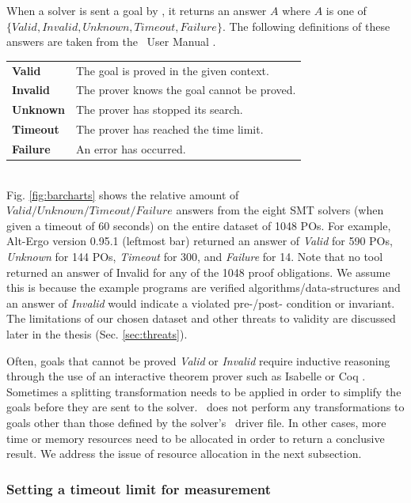 When a solver is sent a goal by \why, it returns an answer $A$ where $A$ is one of $\lbrace Valid,Invalid,Unknown,Timeout,Failure \rbrace$. The following definitions of these answers are taken from the \why~User Manual \cite{why:manual}.\\  

\begin{tabularx}
	{\textwidth}{@{}ll@{}}
	\textbf{Valid}   & The goal is proved in the given context. \\
	\textbf{Invalid} & The prover knows the goal cannot be proved. \\  
	\textbf{Unknown} & The prover has stopped its search.\\
	\textbf{Timeout} & The prover has reached the time limit. \\
	\textbf{Failure} & An error has occurred. \\
\end{tabularx}\\

Fig. \ref{fig:barcharts} shows the relative amount of $Valid / Unknown / Timeout / Failure$ answers from the eight SMT solvers (when given a timeout of 60 seconds) on the entire dataset of 1048 POs. 
For example, Alt-Ergo version 0.95.1 (leftmost bar) returned an answer of \textit{Valid} for 590 POs, \textit{Unknown} for 144 POs, \textit{Timeout} for 300, and \textit{Failure} for 14.
Note that no tool returned an answer of Invalid for any of the 1048 proof obligations.
We assume this is because the example programs are verified algorithms/data-structures and an answer of \textit{Invalid} would indicate a violated pre-/post- condition or invariant.
The limitations of our chosen dataset and other threats to validity are discussed later in the thesis (Sec. \ref{sec:threats}).

Often, goals that cannot be proved \textit{Valid} or \textit{Invalid} require inductive reasoning through the use of an interactive theorem prover such as Isabelle \cite{Isabelle} or Coq \cite{Coq}. 
Sometimes a splitting transformation needs to be applied in order to simplify the goals before they are sent to the solver. 
\where~does not perform any transformations to goals other than those defined by the solver's \why~driver file. 
In other cases, more time or memory resources need to be allocated in order to return a conclusive result. 
We address the issue of resource allocation in the next subsection.    

\subsubsection{Setting a timeout limit for measurement}
\label{sub:timeout-limit}

